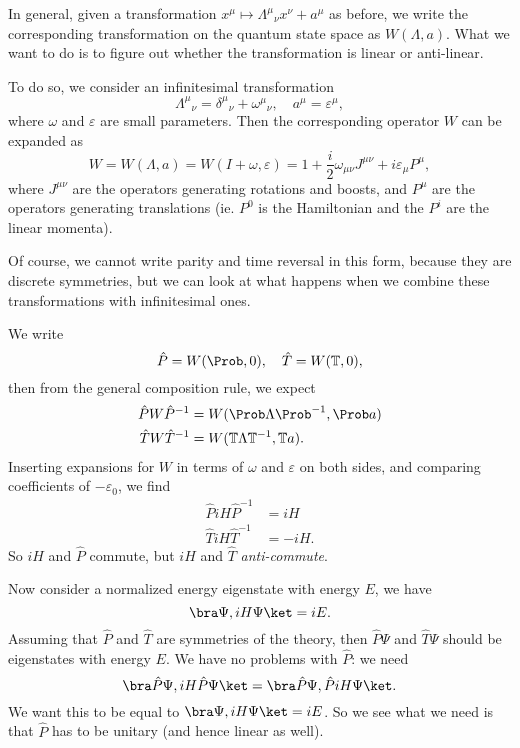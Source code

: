 \documentclass[a4paper]{article}
\begin{document}
In general, given a transformation $x^\mu \mapsto \Lambda^\mu\!_\nu x^\nu + a^\mu$ as before, we write the corresponding transformation on the quantum state space as $W(\Lambda, a)$. What we want to do is to figure out whether the transformation is linear or anti-linear.

To do so, we consider an infinitesimal transformation
\[
  \Lambda^\mu\!_\nu = \delta^\mu\!_\nu + \omega^\mu\!_\nu,\quad a^\mu = \varepsilon^\mu,
\]
where $\omega$ and $\varepsilon$ are small parameters. Then the corresponding operator $W$ can be expanded as
\[
  W = W(\Lambda, a) = W(I + \omega, \varepsilon) = 1 + \frac{i}{2} \omega_{\mu\nu} J^{\mu\nu} + i \varepsilon_\mu P^\mu,
\]
where $J^{\mu\nu}$ are the operators generating rotations and boosts, and $P^\mu$ are the operators generating translations (ie. $P^0$ is the Hamiltonian and the $P^i$ are the linear momenta).

Of course, we cannot write parity and time reversal in this form, because they are discrete symmetries, but we can look at what happens when we combine these transformations with infinitesimal ones.

We write
\[
  \hat{P} = W(\Prob, 0),\quad \hat{T} = W(\mathbb{T}, 0),
\]
then from the general composition rule, we expect
\begin{align*}
  \hat{P} W \hat{P}^{-1} &= W(\Prob \Lambda \Prob^{-1}, \Prob a)\\
  \hat{T} W \hat{T}^{-1} &= W(\mathbb{T} \Lambda \mathbb{T}^{-1}, \mathbb{T} a).
\end{align*}
Inserting expansions for $W$ in terms of $\omega$ and $\varepsilon$ on both sides, and comparing coefficients of $- \varepsilon_0$, we find
\begin{align*}
  \hat{P} i H \hat{P}^{-1} &= iH\\
  \hat{T} iH \hat{T}^{-1} &= -iH.
\end{align*}
So $iH$ and $\hat{P}$ commute, but $iH$ and $\hat{T}$ \emph{anti-commute}.

Now consider a normalized energy eigenstate with energy $E$, we have
\[
  \bra \Psi, i H \Psi\ket = iE.
\]
Assuming that $\hat{P}$ and $\hat{T}$ are symmetries of the theory, then $\hat{P} \Psi$ and $\hat{T} \Psi$ should be eigenstates with energy $E$. We have no problems with $\hat{P}$: we need
\[
  \bra \hat{P} \Psi, iH \hat{P} \Psi\ket = \bra \hat{P} \Psi, \hat{P} iH \Psi \ket.
\]
We want this to be equal to $\bra \Psi, iH \Psi\ket = iE$. So we see what we need is that $\hat{P}$ has to be unitary (and hence linear as well).
\end{document}
